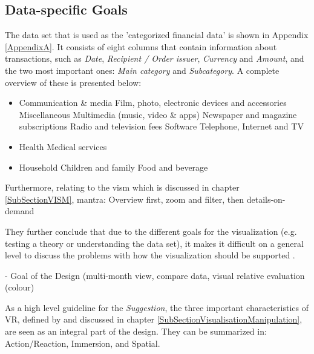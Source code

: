 
\subsection{Data-specific Goals}

The data set that is used as the 'categorized financial data' is shown in Appendix \ref{AppendixA}. It consists of eight columns that contain information about transactions, such as \textit{Date}, \textit{Recipient / Order issuer}, \textit{Currency} and \textit{Amount}, and the two most important ones: \textit{Main category} and \textit{Subcategory}. A complete overview of these is presented below:
\begin{itemize}[noitemsep,nolistsep]
	\item Communication \& media
		\subitem Film, photo, electronic devices and accessories
		\subitem Miscellaneous
		\subitem Multimedia (music, video \& apps)
		\subitem Newspaper and magazine subscriptions
		\subitem Radio and television fees
		\subitem Software
		\subitem Telephone,  Internet and TV
	\item Health
		\subitem Medical services 
	\item Household
		\subitem Children and family
		\subitem Food and beverage
\end{itemize}


Furthermore, relating to the \gls{vism} which is discussed in chapter \ref{SubSectionVISM}, 
mantra: Overview first, zoom and filter, then details-on-demand

They further conclude that due to the different goals for the visualization (e.g. testing a theory or understanding the data set), it makes it difficult on a general level to discuss the problems with how the visualization should be supported \citep{Stone1994}.


- Goal of the Design (multi-month view, compare data, visual relative evaluation (colour)

As a high level guideline for the \textit{Suggestion}, the three important characteristics of VR, defined by \cite{Stone1994} and discussed in chapter \ref{SubSectionVisualisationManipulation}, are seen as an integral part of the design. They can be summarized in: Action/Reaction, Immersion, and Spatial. \newline




